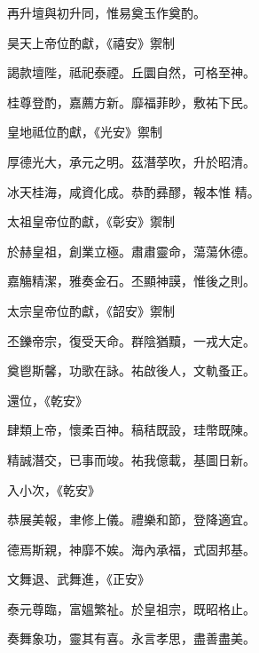 \begin{pinyinscope}
 再升壇與初升同，惟易奠玉作奠酌。



 昊天上帝位酌獻，《禧安》禦制



 謁款壇陛，祗祀泰禋。丘圜自然，可格至神。



 桂尊登酌，嘉薦方新。靡福菲眇，敷祐下民。



 皇地祗位酌獻，《光安》禦制



 厚德光大，承元之明。茲潛莩吹，升於昭清。



 冰天桂海，咸資化成。恭酌彞醪，報本惟
 精。



 太祖皇帝位酌獻，《彰安》禦制



 於赫皇祖，創業立極。肅肅靈命，蕩蕩休德。



 嘉觴精潔，雅奏金石。丕顯神謨，惟後之則。



 太宗皇帝位酌獻，《韶安》禦制



 丕鑠帝宗，復受天命。群陰猶黷，一戎大定。



 奠鬯斯馨，功歌在詠。祐啟後人，文軌蚤正。



 還位，《乾安》



 肆類上帝，懷柔百神。稿秸既設，珪幣既陳。



 精誠潛交，已事而竣。祐我億載，基圖日新。



 入小次，《乾安》



 恭展美報，聿修上儀。禮樂和節，登降適宜。



 德焉斯親，神靡不娭。海內承福，式固邦基。



 文舞退、武舞進，《正安》



 泰元尊臨，富媼繁祉。於皇祖宗，既昭格止。



 奏舞象功，靈其有喜。永言孝思，盡善盡美。




\end{pinyinscope}
